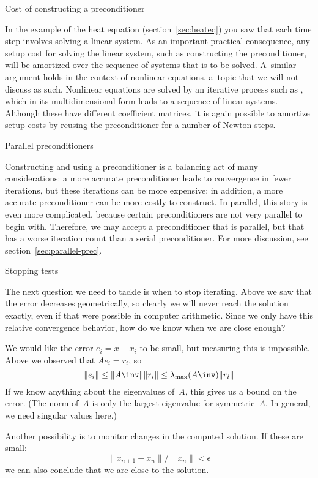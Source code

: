  {Cost of constructing a preconditioner}

In the example of the heat equation (section~\ref{sec:heateq}) you saw
that each time step involves solving a linear system. As an important
practical consequence, any setup cost for solving the linear system,
such as constructing the preconditioner,
will be amortized over the sequence of systems that is to be
solved. A~similar argument holds in the context of nonlinear
equations, a~topic that we will not discuss as such. Nonlinear
equations are solved by an iterative process such as
, which in its multidimensional form leads
to a sequence of linear systems. Although these have different
coefficient matrices, it is again possible to amortize setup costs by
reusing the preconditioner for a number of Newton steps.

 {Parallel preconditioners}

Constructing and using a preconditioner is a balancing act of many
considerations: a more accurate preconditioner leads to convergence in
fewer iterations, but these iterations can be more expensive; in
addition, a more accurate preconditioner can be more costly to
construct. In parallel, this story is even more complicated, because
certain preconditioners are not very parallel to begin
with. Therefore, we may accept a preconditioner that is parallel, but
that has a worse iteration count than a serial preconditioner. For
more discussion, see section~\ref{sec:parallel-prec}.


 {Stopping tests}

The next question we need to tackle is when to stop iterating. Above
we saw that the error decreases geometrically, so clearly we will
never reach the solution exactly, even if that were possible in
computer arithmetic. Since we only have this relative convergence
behavior, how do we know when we are close enough?

We would like the error $e_i=x-x_i$ to be small, but measuring this is
impossible. Above we observed that $Ae_i=r_i$, so
\[ \|e_i\|\leq \|A\inv\|\|r_i\| 
    \leq \lambda_{\max}(A\inv)\|r_i\|
\]
If we know anything about the eigenvalues of~$A$, this gives us a
bound on the error. (The norm of~$A$ is only the largest eigenvalue
for symmetric~$A$. In general, we need singular values here.)

Another possibility is to monitor changes in the computed solution. If
these are small:
    \[ \| x_{n+1}-x_n\|/\|x_n\|<\epsilon \]
we can also conclude that we are close to the solution.

